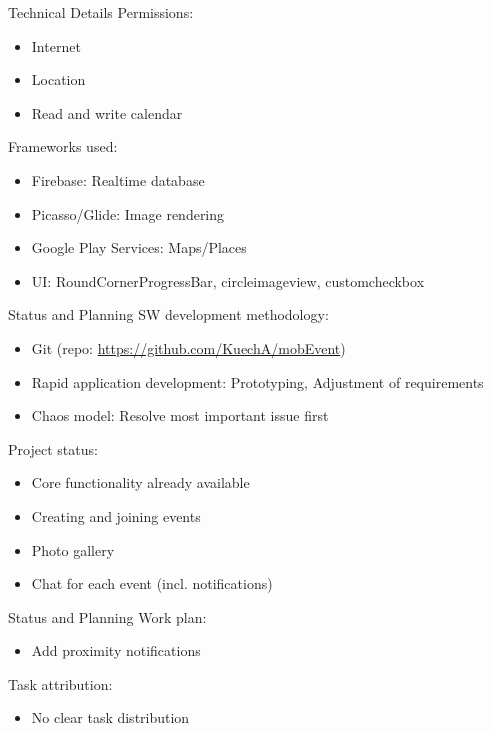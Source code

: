 \documentclass[logo=EURECOM,english]{eurecombeamer}
\begin{document}
\begin{frame}{Technical Details}
Permissions:
\begin{itemize}
\item Internet
\item Location
\item Read and write calendar\bigskip
\end{itemize}
Frameworks used:
\begin{itemize}
\item Firebase: Realtime database
\item Picasso/Glide: Image rendering
\item Google Play Services: Maps/Places
\item UI: RoundCornerProgressBar, circleimageview, customcheckbox
\end{itemize}
\end{frame}

\begin{frame}{Status and Planning}
SW development methodology:
\begin{itemize}
\item Git (repo: \url{https://github.com/KuechA/mobEvent})
\item Rapid application development: Prototyping, Adjustment of requirements
\item Chaos model: Resolve most important issue first\bigskip
\end{itemize}
Project status:
\begin{itemize}
\item Core functionality already available
\item Creating and joining events
\item Photo gallery
\item Chat for each event (incl. notifications)
\end{itemize}
\end{frame}

\begin{frame}{Status and Planning}
Work plan:
\begin{itemize}
\item Add proximity notifications\bigskip
\end{itemize}
Task attribution:
\begin{itemize}
\item No clear task distribution
\end{itemize}
\end{frame}

\begin{frame}
\end{frame}

\begin{frame}
\end{frame}
\end{document}
